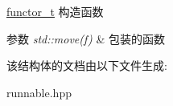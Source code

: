 \hyperlink{structRunnable_1_1functor__t}{functor\+\_\+t} 构造函数 


\begin{DoxyParams}{参数}
{\em std\+::move(f)} & 包装的函数 \\
\hline
\end{DoxyParams}


该结构体的文档由以下文件生成\+:\begin{DoxyCompactItemize}
\item 
runnable.\+hpp\end{DoxyCompactItemize}
